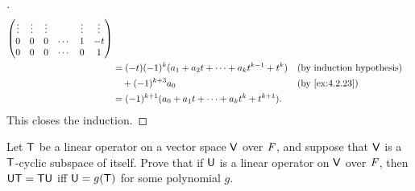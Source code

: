 \begin{proof}[]
\begin{align*}
\begin{pmatrix}
                                            \vdots & \vdots & \vdots &        & \vdots & \vdots \\
                                            0      & 0      & 0      & \cdots & 1      & -t     \\
                                            0      & 0      & 0      & \cdots & 0      & 1
                                          \end{pmatrix}                                                \\
            & = (-t) (-1)^k (a_1 + a_2 t + \cdots + a_k t^{k - 1} + t^k)                               &  & \text{(by induction hypothesis)} \\
            & \quad + (-1)^{k + 3} a_0                                                                 &  & \text{(by \cref{ex:4.2.23})}     \\
            & = (-1)^{k + 1} (a_0 + a_1 t + \cdots + a_k t^k + t^{k + 1}).
  \end{align*}
  This closes the induction.
\end{proof}

\begin{ex}\label{ex:5.4.20}
  Let \(\mathsf{T}\) be a linear operator on a vector space \(\mathsf{V}\) over \(\mathit{F}\), and suppose that \(\mathsf{V}\) is a \(\mathsf{T}\)-cyclic subspace of itself.
  Prove that if \(\mathsf{U}\) is a linear operator on \(\mathsf{V}\) over \(\mathit{F}\), then \(\mathsf{U} \mathsf{T} = \mathsf{T} \mathsf{U}\) iff \(\mathsf{U} = g(\mathsf{T})\) for some polynomial \(g\).
\end{ex}

